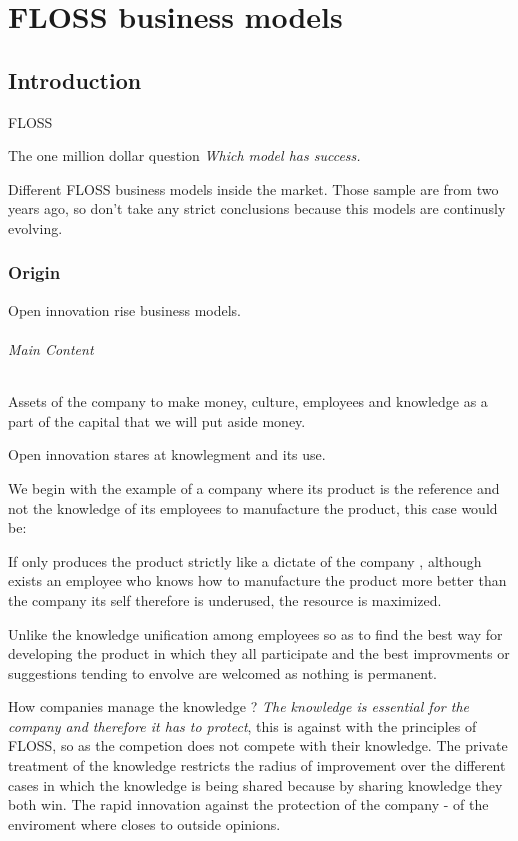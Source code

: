 \chapter{FLOSS business models}

\section{Introduction}\label{lesson-4-introduction}

FLOSS 

The one million dollar question \emph{Which model has success.}

Different FLOSS business models inside the market. Those sample are from two years ago, so don't take any strict conclusions because this models are continusly evolving.

\subsection{Origin}\label{lesson-4-origin}

Open innovation rise business models.

\subparagraph{Main Content}

Assets of the company to make money, culture, employees and knowledge as a part
of the capital that we will put aside money.

Open innovation stares at knowlegment and its use.

We begin with the example of a company where its product is the reference and
not the knowledge of its employees to manufacture the product, this case would
be:

If only produces the product strictly like a dictate of the company , although
exists an employee who knows how to manufacture the product more better than the
company its self therefore is underused, the resource is maximized.

Unlike the knowledge unification among employees so as to find the best way for
developing the product in which they all participate and the best improvments or
suggestions tending to envolve are welcomed as nothing is permanent.

How companies manage the knowledge ? \emph{The knowledge is essential for the
company and therefore it has to protect}, this is against with the
principles of  FLOSS, so as the competion does not compete with their
knowledge. The private treatment of the knowledge restricts the radius of
improvement over the different cases in which the knowledge is being shared because by sharing knowledge they both
win. The rapid innovation against the protection of the company - of the
enviroment where closes to outside opinions.

